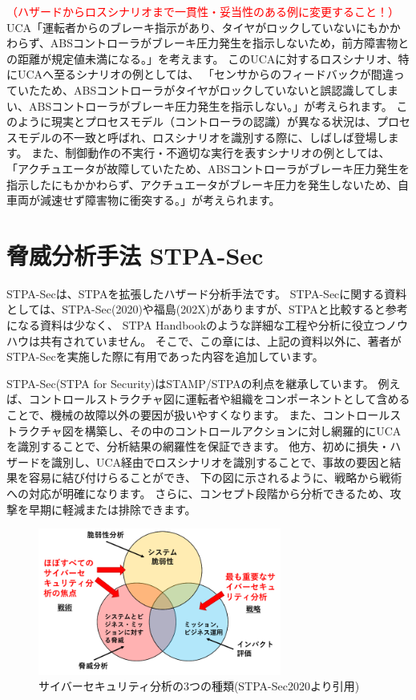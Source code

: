 \textcolor{red}{（ハザードからロスシナリオまで一貫性・妥当性のある例に変更すること！）}
UCA「運転者からのブレーキ指示があり、タイヤがロックしていないにもかかわらず、ABSコントローラがブレーキ圧力発生を指示しないため，前方障害物との距離が規定値未満になる。」を考えます。
このUCAに対するロスシナリオ、特にUCAへ至るシナリオの例としては、
「センサからのフィードバックが間違っていたため、ABSコントローラがタイヤがロックしていないと誤認識してしまい、ABSコントローラがブレーキ圧力発生を指示しない。」が考えられます。
このように現実とプロセスモデル（コントローラの認識）が異なる状況は、プロセスモデルの不一致と呼ばれ、ロスシナリオを識別する際に、しばしば登場します。
また、制御動作の不実行・不適切な実行を表すシナリオの例としては、
「アクチュエータが故障していたため、ABSコントローラがブレーキ圧力発生を指示したにもかかわらず、アクチュエータがブレーキ圧力を発生しないため、自車両が減速せず障害物に衝突する。」が考えられます。

\section{脅威分析手法 STPA-Sec}

STPA-Secは、STPAを拡張したハザード分析手法です。
STPA-Secに関する資料としては、STPA-Sec(2020)や福島(202X)がありますが、STPAと比較すると参考になる資料は少なく、
STPA Handbookのような詳細な工程や分析に役立つノウハウは共有されていません。
そこで、この章には、上記の資料以外に、著者がSTPA-Secを実施した際に有用であった内容を追加しています。

STPA-Sec(STPA for Security)はSTAMP/STPAの利点を継承しています。
例えば、コントロールストラクチャ図に運転者や組織をコンポーネントとして含めることで、機械の故障以外の要因が扱いやすくなります。
また、コントロールストラクチャ図を構築し、その中のコントロールアクションに対し網羅的にUCAを識別することで、分析結果の網羅性を保証できます。
他方、初めに損失・ハザードを識別し、UCA経由でロスシナリオを識別することで、事故の要因と結果を容易に結び付けらることができ、
下の図に示されるように、戦略から戦術への対応が明確になります。
さらに、コンセプト段階から分析できるため、攻撃を早期に軽減または排除できます。
%
\begin{figure}[H]
    \centering
    \includegraphics[width=80mm]{safety_assurance_contents/ch3images/fig-3-3-1-01.png}
    \caption[short]{サイバーセキュリティ分析の3つの種類(STPA-Sec2020より引用)}
\end{figure}

